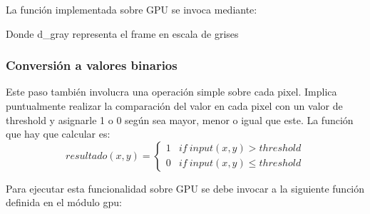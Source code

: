 \documentclass[a4paper,10pt]{report}
\begin{document}
La función implementada sobre GPU se invoca mediante:

 \begin{center}
\end{center}

Donde d\_gray representa el frame en escala de grises



 \subsubsection{Conversión a valores binarios}
 Este paso también involucra una operación simple sobre cada pixel. 
 Implica puntualmente realizar la comparación del valor en cada pixel con un valor de threshold y asignarle 1 o 0 según sea mayor, menor o igual que este.
 La función que hay que calcular es: 
 \begin{displaymath}
   resultado(x,y) = \left\{
     \begin{array}{lr}
       1 &  if\ input(x,y) > threshold\\
       0 &  if\ input(x,y) \leq threshold
     \end{array}
   \right.
\end{displaymath} 


Para ejecutar esta funcionalidad sobre GPU se debe invocar a la siguiente función definida en el módulo gpu: 
 \begin{center}
\end{center}
\end{document}
